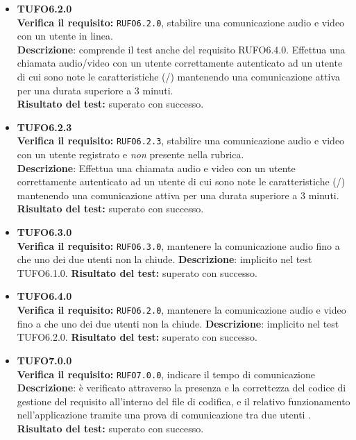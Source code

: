 \begin{itemize}
\item \textbf{TUFO6.2.0}\\
\textbf{Verifica il requisito:} \texttt{RUFO6.2.0}, stabilire una comunicazione audio e video con un utente in linea.\\
\textbf{Descrizione}: comprende il test anche del requisito RUFO6.4.0. Effettua una chiamata audio/video con un utente  correttamente autenticato ad un utente  di cui sono note le caratteristiche (/) mantenendo una comunicazione attiva per una durata superiore a 3 minuti.\\
\textbf{Risultato del test:} superato con successo.

\item \textbf{TUFO6.2.3}\\ 
\textbf{Verifica il requisito:} \texttt{RUFO6.2.3}, stabilire una comunicazione audio e video con un utente registrato e \textit{non} presente nella rubrica.\\
\textbf{Descrizione}: Effettua una chiamata audio e video con un utente  correttamente autenticato ad un utente  di cui sono note le caratteristiche (/) mantenendo una comunicazione attiva per una durata superiore a 3 minuti.\\
\textbf{Risultato del test:} superato con successo.

\item \textbf{TUFO6.3.0}\\
\textbf{Verifica il requisito:} \texttt{RUFO6.3.0}, mantenere la comunicazione audio fino a che uno dei due utenti non la chiude.
\textbf{Descrizione}: implicito nel test TUFO6.1.0.
\textbf{Risultato del test:} superato con successo.

\item \textbf{TUFO6.4.0}\\
\textbf{Verifica il requisito:} \texttt{RUFO6.2.0}, mantenere la comunicazione audio e video fino a che uno dei due utenti non la chiude.
\textbf{Descrizione}: implicito nel test TUFO6.2.0.
\textbf{Risultato del test:} superato con successo.

\item \textbf{TUFO7.0.0}\\
\textbf{Verifica il requisito:} \texttt{RUFO7.0.0}, indicare il tempo di comunicazione\\
\textbf{Descrizione}: è verificato attraverso la presenza e la correttezza del codice di gestione del requisito all'interno del file di codifica, e il relativo funzionamento nell'applicazione tramite una prova di comunicazione tra due utenti .\\
\textbf{Risultato del test:} superato con successo.


\end{itemize}
